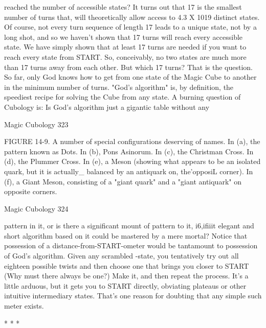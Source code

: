 reached the number of accessible states? It turns out that 17 is the smallest number of
turns that, will theoretically allow access to 4.3 X 1019 distinct states. Of course, not
every turn sequence of length 17 leads to a unique state, not by a long shot, and so we
haven't shown that 17 turns will reach every accessible state. We have simply shown
that at least 17 turns are needed if you want to reach every state from START. So,
conceivably, no two states are much more than 17 turns away from each other. But
which 17 turns? That is the question.
        So far, only God knows how to get from one state of the Magic Cube to
another in the minimum number of turns. "God's algorithm" is, by definition, the
speediest recipe for solving the Cube from any state. A burning question of Cubology
is: Is God's algorithm just a gigantic table without any




Magic Cubology                                                                        323

FIGURE 14-9. A number of special configurations deserving of names. In (a), the
pattern known as Dots. In (b), Pons Asinorum. In (c), the Christman Cross. In (d), the
Plummer Cross. In (e), a Meson (showing what appears to be an isolated quark, but it
is actually\_ balanced by an antiquark on, the'opposiL corner). In (f), a Giant Meson,
consisting of a "giant quark" and a "giant antiquark" on opposite corners.




Magic Cubology                                                                    324

pattern in it, or is there a significant mount of pattern to it, i6,ifiiit elegant and short
algorithm based on it could be mastered by a mere mortal? Notice that possession of a
distance-from-START-ometer would be tantamount to possession of God's algorithm.
Given any scrambled -state, you tentatively try out all eighteen possible twists and
then choose one that brings you closer to START (Why must there always be one?)
Make it, and then repeat the process. It's a little arduous, but it gets you to START
directly, obviating plateaus or other intuitive intermediary states. That's one reason for
doubting that any simple such meter exists.

                                         *   *   *


